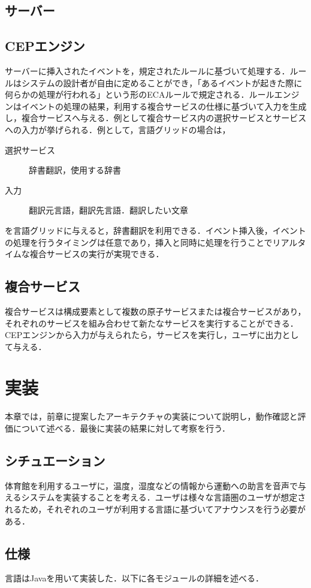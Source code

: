 \documentclass{kuisthesis}			%
\begin{document}
\subsection{サーバー}

\subsection{CEPエンジン}
サーバーに挿入されたイベントを，規定されたルールに基づいて処理する．ルールはシステムの設計者が自由に定めることができ，「あるイベントが起きた際に何らかの処理が行われる」という形のECAルールで規定される．ルールエンジンはイベントの処理の結果，利用する複合サービスの仕様に基づいて入力を生成し，複合サービスへ与える．例として複合サービス内の選択サービスとサービスへの入力が挙げられる．例として，言語グリッドの場合は，
\begin{description}
\item[選択サービス] 辞書翻訳，使用する辞書
\item[入力] 翻訳元言語，翻訳先言語．翻訳したい文章
\end{description}
を言語グリッドに与えると，辞書翻訳を利用できる．イベント挿入後，イベントの処理を行うタイミングは任意であり，挿入と同時に処理を行うことでリアルタイムな複合サービスの実行が実現できる．
\subsection{複合サービス}
複合サービスは構成要素として複数の原子サービスまたは複合サービスがあり，それぞれのサービスを組み合わせて新たなサービスを実行することができる．CEPエンジンから入力が与えられたら，サービスを実行し，ユーザに出力として与える．
\section{実装}
本章では，前章に提案したアーキテクチャの実装について説明し，動作確認と評価について述べる．最後に実装の結果に対して考察を行う．
\subsection{シチュエーション}
体育館を利用するユーザに，温度，湿度などの情報から運動への助言を音声で与えるシステムを実装することを考える．ユーザは様々な言語圏のユーザが想定されるため，それぞれのユーザが利用する言語に基づいてアナウンスを行う必要がある．

\subsection{仕様}
言語はJavaを用いて実装した．以下に各モジュールの詳細を述べる．
\end{document}
